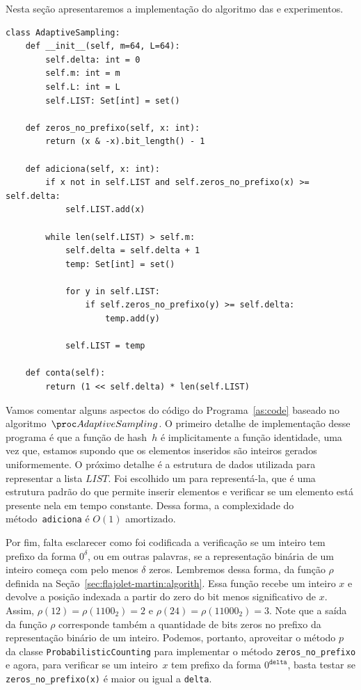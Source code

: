 Nesta seção apresentaremos a implementação do algoritmo das   e experimentos.

\begin{lstlisting}[style=mypython,caption=Implementação do algoritmo $\AS$,captionpos=b, label=as:code]
class AdaptiveSampling:
    def __init__(self, m=64, L=64):
        self.delta: int = 0
        self.m: int = m
        self.L: int = L
        self.LIST: Set[int] = set()
   
    def zeros_no_prefixo(self, x: int):
        return (x & -x).bit_length() - 1

    def adiciona(self, x: int):
        if x not in self.LIST and self.zeros_no_prefixo(x) >= self.delta:
            self.LIST.add(x)

        while len(self.LIST) > self.m:
            self.delta = self.delta + 1
            temp: Set[int] = set()

            for y in self.LIST:
                if self.zeros_no_prefixo(y) >= self.delta:
                    temp.add(y)

            self.LIST = temp

    def conta(self):
        return (1 << self.delta) * len(self.LIST)
\end{lstlisting}

Vamos comentar alguns aspectos do código do Programa~\ref{as:code} baseado no algoritmo~$\AS$. O primeiro detalhe de 
implementação desse programa é que a função de hash~$h$ é implicitamente a função identidade, uma vez que, estamos 
supondo que os elementos inseridos são inteiros gerados uniformemente. O próximo detalhe é a estrutura de dados 
utilizada para representar a lista $LIST$. Foi escolhido um  para representá-la, que é uma estrutura padrão do 
 que permite inserir elementos e verificar se um elemento está presente nela em tempo constante. Dessa 
forma, a complexidade do método~\texttt{adiciona} é $O(1)$ amortizado.

Por fim, falta esclarecer como foi codificada a verificação se um inteiro tem prefixo da forma $0^{\delta}$, ou em 
outras palavras, se a representação binária de um inteiro começa com pelo menos $\delta$ zeros. Lembremos dessa forma, 
da função $\rho$ definida na Seção~\ref{sec:flajolet-martin:algorith}. Essa função recebe um inteiro $x$ e devolve a 
posição indexada a partir do zero do bit menos significativo de $x$. Assim, $\rho(12) = \rho(1100_2) = 2$ e 
$\rho(24) = \rho(11000_2) = 3$. Note que a saída da função $\rho$ corresponde também a quantidade de bits zeros no 
prefixo da representação binário de um inteiro. Podemos, portanto, aproveitar o método $p$ da classe 
\texttt{ProbabilisticCounting} para implementar o método \texttt{zeros\_no\_prefixo} e agora, para verificar se um 
inteiro~$x$ tem prefixo da forma $0^{\texttt{delta}}$, basta testar se \texttt{zeros\_no\_prefixo(x)} é maior ou igual a
\texttt{delta}.

